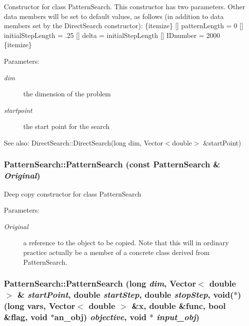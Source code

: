 Constructor for class Pattern\-Search. This constructor has two parameters. Other data members will be set to default values, as follows (in addition to data members set by the Direct\-Search constructor): \{itemize\} [] pattern\-Length = 0 [] initial\-Step\-Length = .25 [] delta = initial\-Step\-Length [] IDnumber = 2000 \{itemize\}

\begin{Desc}
\item[Parameters:]
\begin{description}
\item[{\em dim}]the dimension of the problem \item[{\em startpoint}]the start point for the search \end{description}
\end{Desc}
\begin{Desc}
\item[See also:]Direct\-Search::Direct\-Search(long dim, Vector$<$double$>$ \&start\-Point) \end{Desc}
\subsubsection{\setlength{\rightskip}{0pt plus 5cm}Pattern\-Search::Pattern\-Search (const {\bf Pattern\-Search} \& {\em Original})}\label{classPatternSearch_z15_1}


Deep copy constructor for class Pattern\-Search \begin{Desc}
\item[Parameters:]
\begin{description}
\item[{\em Original}]a reference to the object to be copied. Note that this will in ordinary practice actually be a member of a concrete class derived from Pattern\-Search. \end{description}
\end{Desc}
\subsubsection{\setlength{\rightskip}{0pt plus 5cm}Pattern\-Search::Pattern\-Search (long {\em dim}, Vector$<$ double $>$ \& {\em start\-Point}, double {\em start\-Step}, double {\em stop\-Step}, void($\ast$)(long vars, Vector$<$ double $>$ \&x, double \&func, bool \&flag, void $\ast$an\_\-obj) {\em objective}, void $\ast$ {\em input\_\-obj})}\label{classPatternSearch_z15_2}



